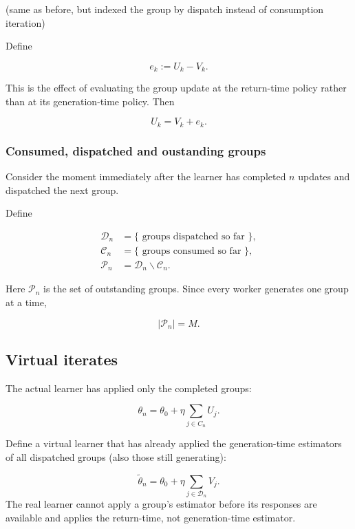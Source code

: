 (same as before, but indexed the group by dispatch instead of consumption iteration)

Define

$$
e_k:=U_k-V_k .
$$

This is the effect of evaluating the group update at the return-time policy rather than at its generation-time policy.
Then

$$
U_k=V_k+e_k .
$$

\subsubsection{Consumed, dispatched and oustanding groups}
Consider the moment immediately after the learner has completed $n$ updates and dispatched the next group.

Define

$$
\begin{aligned}
\mathcal{D}_n & =\{\text { groups dispatched so far }\}, \\
\mathcal{C}_n & =\{\text { groups consumed so far }\}, \\
\mathcal{P}_n & =\mathcal{D}_n \backslash \mathcal{C}_n .
\end{aligned}
$$


Here $\mathcal{P}_n$ is the set of outstanding groups.
Since every worker generates one group at a time,

$$
\left|\mathcal{P}_n\right|=M .
$$

\subsection{Virtual iterates}

The actual learner has applied only the completed groups:

$$
\theta_n=\theta_0+\eta \sum_{j \in C_n} U_j .
$$

Define a virtual learner that has already applied the generation-time estimators of all dispatched groups (also those still generating):

$$
\tilde{\theta}_n=\theta_0+\eta \sum_{j \in \mathcal{D}_n} V_j .
$$
The real learner cannot apply a group's estimator before its responses are available and applies the return-time, not generation-time estimator.

